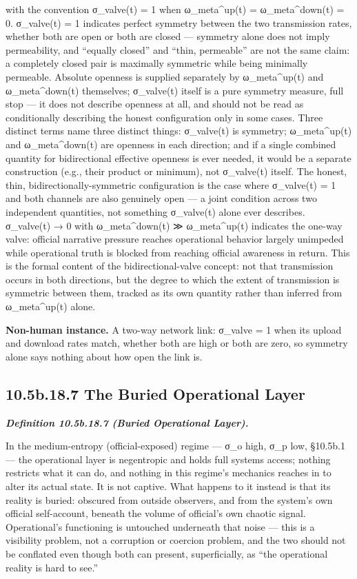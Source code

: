 \documentclass[
]{article}
\begin{document}
with the convention σ\_valve(t) = 1 when ω\_meta\^{}up(t) =
ω\_meta\^{}down(t) = 0. σ\_valve(t) = 1 indicates perfect symmetry
between the two transmission rates, whether both are open or both are
closed --- symmetry alone does not imply permeability, and ``equally
closed'' and ``thin, permeable'' are not the same claim: a completely
closed pair is maximally symmetric while being minimally permeable.
Absolute openness is supplied separately by ω\_meta\^{}up(t) and
ω\_meta\^{}down(t) themselves; σ\_valve(t) itself is a pure symmetry
measure, full stop --- it does not describe openness at all, and should
not be read as conditionally describing the honest configuration only in
some cases. Three distinct terms name three distinct things: σ\_valve(t)
is symmetry; ω\_meta\^{}up(t) and ω\_meta\^{}down(t) are openness in
each direction; and if a single combined quantity for bidirectional
effective openness is ever needed, it would be a separate construction
(e.g., their product or minimum), not σ\_valve(t) itself. The honest,
thin, bidirectionally-symmetric configuration is the case where
σ\_valve(t) = 1 and both channels are also genuinely open --- a joint
condition across two independent quantities, not something σ\_valve(t)
alone ever describes. σ\_valve(t) → 0 with ω\_meta\^{}down(t) ≫
ω\_meta\^{}up(t) indicates the one-way valve: official narrative
pressure reaches operational behavior largely unimpeded while
operational truth is blocked from reaching official awareness in return.
This is the formal content of the bidirectional-valve concept: not that
transmission occurs in both directions, but the degree to which the
extent of transmission is symmetric between them, tracked as its own
quantity rather than inferred from ω\_meta\^{}up(t) alone.

\textbf{Non-human instance.} A two-way network link: σ\_valve = 1 when
its upload and download rates match, whether both are high or both are
zero, so symmetry alone says nothing about how open the link is.

\hypertarget{b.18.7-the-buried-operational-layer}{%
\subsection{10.5b.18.7 The Buried Operational
Layer}\label{b.18.7-the-buried-operational-layer}}

\emph{\textbf{Definition 10.5b.18.7 (Buried Operational Layer).}}

In the medium-entropy (official-exposed) regime --- σ\_o high, σ\_p low,
§10.5b.1 --- the operational layer is negentropic and holds full systems
access; nothing restricts what it can do, and nothing in this regime's
mechanics reaches in to alter its actual state. It is not captive. What
happens to it instead is that its reality is buried: obscured from
outside observers, and from the system's own official self-account,
beneath the volume of official's own chaotic signal. Operational's
functioning is untouched underneath that noise --- this is a visibility
problem, not a corruption or coercion problem, and the two should not be
conflated even though both can present, superficially, as ``the
operational reality is hard to see.''
\end{document}
